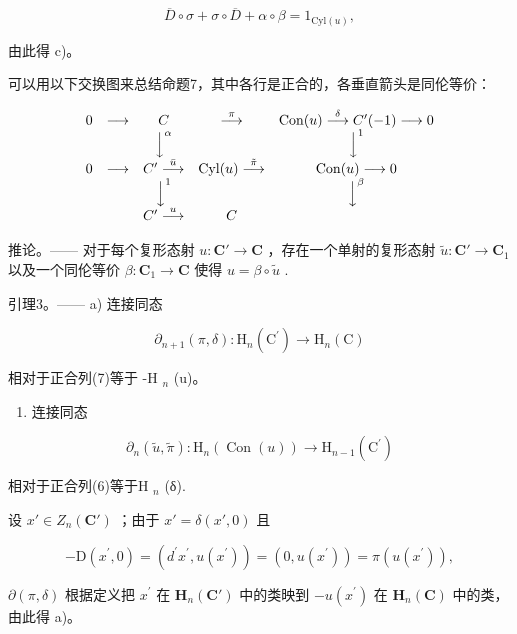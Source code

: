 \[
\overline {{{D}}} \circ \sigma + \sigma \circ \overline {{{D}}} + \alpha \circ \beta = 1 _ {\mathrm{Cyl} (u)},
\]

由此得 c)。

可以用以下交换图来总结命题7，其中各行是正合的，各垂直箭头是同伦等价：

\[
\begin{array}{c c c c c} 0 & \longrightarrow & C & \stackrel {{\pi}} {{\longrightarrow}} & \operatorname{Con} (u) \stackrel {{\delta}} {{\longrightarrow}} C ^ {\prime} (- 1) \longrightarrow 0 \\ & & \Big \downarrow^ {\alpha} & & \Big \downarrow^ {1} \\ 0 & \longrightarrow & C ^ {\prime} \stackrel {{\bar {u}}} {{\longrightarrow}} & \operatorname{Cyl} (u) \stackrel {{\tilde {\pi}}} {{\longrightarrow}} & \operatorname{Con} (u) \longrightarrow 0 \\ & & \Big \downarrow^ {1} & & \Big \downarrow^ {\beta} \\ & & C ^ {\prime} \stackrel {{u}} {{\longrightarrow}} & C \end{array}
\]

推论。—— 对于每个复形态射 \(u: \mathbf{C}' \to \mathbf{C}\) ，存在一个单射的复形态射 \(\tilde{u}: \mathbf{C}' \to \mathbf{C}_1\) 以及一个同伦等价 \(\beta: \mathbf{C}_1 \to \mathbf{C}\) 使得 \(u = \beta \circ \tilde{u}\) .

引理3。—— a) 连接同态

\[
\partial_ {n + 1} (\pi , \delta): \mathrm{H} _ {n} (\mathrm{C} ^ {\prime}) \rightarrow \mathrm{H} _ {n} (\mathrm{C})
\]

相对于正合列(7)等于 -H \(_{n}\) (u)。

\begin{enumerate}
\def\labelenumi{\alph{enumi})}
\setcounter{enumi}{1}
\tightlist
\item
  连接同态
\end{enumerate}

\[
\partial_ {n} (\tilde {u}, \tilde {\pi}): \mathrm{H} _ {n} (\operatorname{Con} (u)) \rightarrow \mathrm{H} _ {n - 1} (\mathrm{C} ^ {\prime})
\]

相对于正合列(6)等于H \(_{n}\) (δ).

设 \(x' \in Z_n(\mathbf{C}')\) ；由于 \(x' = \delta(x', 0)\) 且

\[
- \mathrm{D} (x ^ {\prime}, 0) = (d ^ {\prime} x ^ {\prime}, u (x ^ {\prime})) = (0, u (x ^ {\prime})) = \pi (u (x ^ {\prime})),
\]

\(\partial (\pi ,\delta)\) 根据定义把 \(x^{\prime}\) 在 \(\mathbf{H}_n(\mathbf{C}')\) 中的类映到 \(-u(x^{\prime})\) 在 \(\mathbf{H}_n(\mathbf{C})\) 中的类，由此得 a)。

